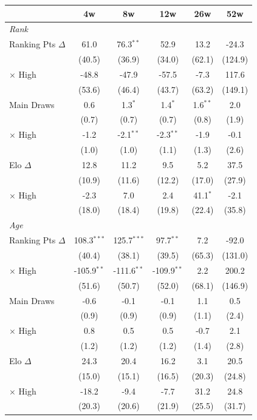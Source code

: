 \begin{tabular}{l*{5}{c}}
\toprule
 & 4w & 8w & 12w & 26w & 52w \\
\midrule
\multicolumn{6}{l}{\textit{Rank}} \\
  Ranking Pts $\Delta$ & 61.0 & 76.3$^{**}$ & 52.9 & 13.2 & -24.3 \\
  & (40.5) & (36.9) & (34.0) & (62.1) & (124.9) \\
  $\times$ High & -48.8 & -47.9 & -57.5 & -7.3 & 117.6 \\
  & (53.6) & (46.4) & (43.7) & (63.2) & (149.1) \\[0.3em]
  Main Draws & 0.6 & 1.3$^{*}$ & 1.4$^{*}$ & 1.6$^{**}$ & 2.0 \\
  & (0.7) & (0.7) & (0.7) & (0.8) & (1.9) \\
  $\times$ High & -1.2 & -2.1$^{**}$ & -2.3$^{**}$ & -1.9 & -0.1 \\
  & (1.0) & (1.0) & (1.1) & (1.3) & (2.6) \\[0.3em]
  Elo $\Delta$ & 12.8 & 11.2 & 9.5 & 5.2 & 37.5 \\
  & (10.9) & (11.6) & (12.2) & (17.0) & (27.9) \\
  $\times$ High & -2.3 & 7.0 & 2.4 & 41.1$^{*}$ & -2.1 \\
  & (18.0) & (18.4) & (19.8) & (22.4) & (35.8) \\[0.3em]
\midrule
\multicolumn{6}{l}{\textit{Age}} \\
  Ranking Pts $\Delta$ & 108.3$^{***}$ & 125.7$^{***}$ & 97.7$^{**}$ & 7.2 & -92.0 \\
  & (40.4) & (38.1) & (39.5) & (65.3) & (131.0) \\
  $\times$ High & -105.9$^{**}$ & -111.6$^{**}$ & -109.9$^{**}$ & 2.2 & 200.2 \\
  & (51.6) & (50.7) & (52.0) & (68.1) & (146.9) \\[0.3em]
  Main Draws & -0.6 & -0.1 & -0.1 & 1.1 & 0.5 \\
  & (0.9) & (0.9) & (0.9) & (1.1) & (2.4) \\
  $\times$ High & 0.8 & 0.5 & 0.5 & -0.7 & 2.1 \\
  & (1.2) & (1.2) & (1.2) & (1.4) & (2.8) \\[0.3em]
  Elo $\Delta$ & 24.3 & 20.4 & 16.2 & 3.1 & 20.5 \\
  & (15.0) & (15.1) & (16.5) & (20.3) & (24.8) \\
  $\times$ High & -18.2 & -9.4 & -7.7 & 31.2 & 24.8 \\
  & (20.3) & (20.6) & (21.9) & (25.5) & (31.7) \\[0.3em]
\midrule
\bottomrule
\end{tabular}
